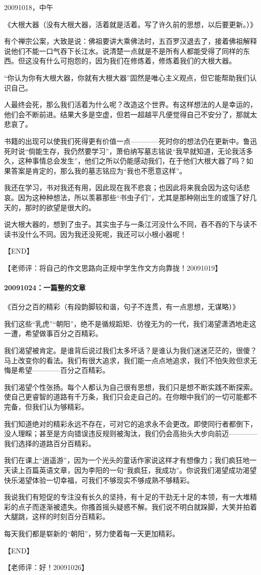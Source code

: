 \documentclass[UTF8]{Diaries}
\begin{document}
20091018，中午

《大根大器（没有大根大器，活着就是活着。写了许久前的思想，以后要更新。）》

有个禅宗公案，大致是说：佛祖要讲大乘佛法时，五百罗汉退去了，接着佛祖解释说他们不能一口气吞下长江水。说清楚一点就是不是所有人都能受得了同样的东西。但这没有什么可抱怨的，因为我们在修炼着，修炼着我们的大根大器。

“你认为你有大根大器，你就有大根大器”固然是唯心主义观点，但它能帮助我们认识自己。

人最终会死，那么我们活着为什么呢？改造这个世界。有这样想法的人是幸运的，他们会不断前进。结果大多是空虚，但若一超越平凡便觉得自己不安分了，那就太悲哀了。

书籍的出现可以使我们死得更有价值一点————死时你的想法仍在更新中。鲁迅死时说“倘能生存，我仍然要学习”，萧伯纳写墓志铭说“我早就知道，无论我活多久，这种事情总会发生”，他们之所以仍能感动我们，在于他们大根大器了吗？如果答案是肯定的，那么我的墓志铭应为“我也不愿意这样”。

我还在学习，书对我还有用，因此现在我不悲哀；也因此将来我会因为这句话悲哀。因为这种种想法，所以羡慕那些“书虫子们”，尤其是那种刚出生的或饿了好几天的，那时的欲望是很大的。

说大根大器的，想到了虫子。其实虫子与一条江河没什么不同，吞不吞的下与读不读书没什么不同。因为我还没死呢，我还可以小根小器呢！

【END】

【老师评：将自己的作文思路向正规中学生作文方向靠拢！20091019】


\paragraph{20091024：一篇整的文章}

《百分之百的精彩（有段韵脚较和谐，句子不连贯，有一点思想，无谋略）》

我们这些“乳虎”“朝阳”，绝不是循规蹈矩、彷徨无为的一代，我们渴望潇洒地走这一遭，希望做事百分之百精彩。

我们渴望被肯定。是谁背后说过我们太多坏话？是谁认为我们迷迷茫茫的，很傻？马上改变你的看法。我们有很大追求，我们能一点点地追求，我们不怕失败但求无悔是希望————百分之百精彩。

我们渴望个性张扬。每个人都认为自己很有思想，我们只是想不断实践不断探索。使自己更睿智的道路有千万条，我们只会走自己的。在你眼中我们的一切可能都不完备，但我们认为够精彩。

我们知道绝对的精彩永远不存在，可对它的追求永不会更改。即使同行者都倒下，没人理睬；甚至是方向错误违反规则被淘汰，我们仍会高抬头大步向前迈————我们选择的道路百分百精彩。

我们在课上“逍遥游”，因为一个光头的童话作家说这样才有想像力；我们疯狂地一天读上百篇英语文章，因为李阳的一句“我疯狂，我成功”。你说我们渴望成功渴望快乐渴望体验一切幸福，可我们不够现实不够成熟不够精彩。

我说我们有短促的专注没有长久的坚持，有十足的干劲无十足的本领，有一大堆精彩的点子而逐渐被遗失。你搔首摇头疑惑不解。我们说不明白就跺脚，大笑并拍着大腿跳，这样的时刻百分百精彩。

每天我们都是崭新的“朝阳”，努力使着每一天更加精彩。

【END】

【老师评：好！20091026】
\end{document}
